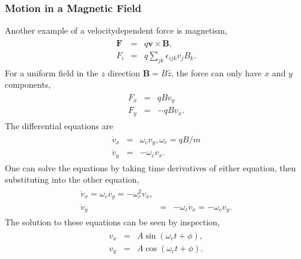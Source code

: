\documentclass[letterpaper,10pt,english]{sphinxmanual}
\begin{document}
\subsubsection{Motion in a Magnetic Field}
\label{\detokenize{chapter3:motion-in-a-magnetic-field}}
Another example of a velocity\sphinxhyphen{}dependent force is magnetism,
\begin{equation*}
\begin{split}
\begin{eqnarray}
\boldsymbol{F}&=&q\boldsymbol{v}\times\boldsymbol{B},\\
\nonumber
F_i&=&q\sum_{jk}\epsilon_{ijk}v_jB_k.
\end{eqnarray}
\end{split}
\end{equation*}
For a uniform field in the \(z\) direction \(\boldsymbol{B}=B\hat{z}\), the force can only have \(x\) and \(y\) components,
\begin{equation*}
\begin{split}
\begin{eqnarray}
F_x&=&qBv_y\\
\nonumber
F_y&=&-qBv_x.
\end{eqnarray}
\end{split}
\end{equation*}
The differential equations are
\begin{equation*}
\begin{split}
\begin{eqnarray}
\dot{v}_x&=&\omega_c v_y,\omega_c= qB/m\\
\nonumber
\dot{v}_y&=&-\omega_c v_x.
\end{eqnarray}
\end{split}
\end{equation*}
One can solve the equations by taking time derivatives of either equation, then substituting into the other equation,
\begin{equation*}
\begin{split}
\begin{eqnarray}
\ddot{v}_x=\omega_c\dot{v_y}=-\omega_c^2v_x,\\
\nonumber
\ddot{v}_y&=&-\omega_c\dot{v}_x=-\omega_cv_y.
\end{eqnarray}
\end{split}
\end{equation*}
The solution to these equations can be seen by inspection,
\begin{equation*}
\begin{split}
\begin{eqnarray}
v_x&=&A\sin(\omega_ct+\phi),\\
\nonumber
v_y&=&A\cos(\omega_ct+\phi).
\end{eqnarray}
\end{split}
\end{equation*}
\end{document}
